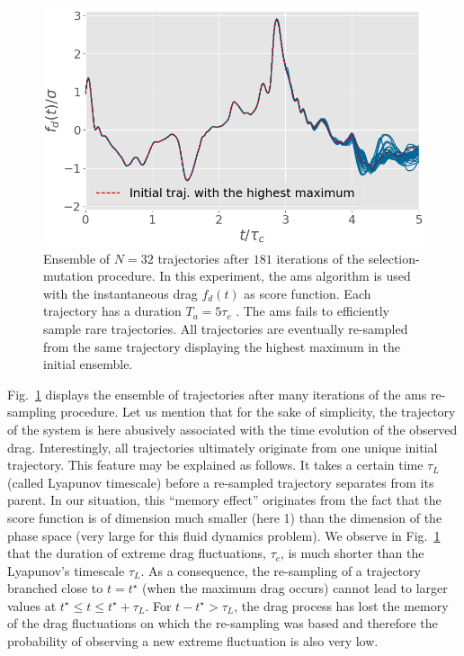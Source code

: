 \documentclass{jfm}
\newcommand{\EL}[1]{{\color{myred}{#1}}}
\begin{document}
\begin{figure}
  \centering
  \includegraphics[width=.7\linewidth]{AMS_drag_trajectories/AMS_drag_trajectories.png}
  \caption{\label{fig:AMS_drag_trajectories} Ensemble of $N = 32$ trajectories after $181$ iterations of the selection-mutation procedure. In this experiment, the \ac{ams} algorithm is used with the instantaneous drag $f_d(t)$ as score function. Each trajectory has a duration $T_a = 5\tau_c$ \EL{ where $\tau_c$ is the correlation time of the instantaneous drag}.
    The \ac{ams} fails to efficiently sample rare trajectories. All trajectories are eventually re-sampled from the same trajectory displaying the highest maximum in the initial ensemble.}
\end{figure}

% 
Fig.~\ref{fig:AMS_drag_trajectories} displays the ensemble of trajectories after many iterations of the \ac{ams} re-sampling procedure.
% 
Let us mention that for the sake of simplicity, the trajectory of the system is here abusively associated with the time evolution of the observed drag.
% 
Interestingly, all trajectories ultimately originate from one unique initial trajectory.
% 
This feature may be explained as follows.
It takes a certain time $\tau_L$ (called Lyapunov timescale) before a re-sampled trajectory separates from its parent. In our situation, this ``memory effect'' originates from the fact that the score function is of dimension much smaller (here 1) than the dimension of the phase space (very large for this fluid dynamics problem).
% 
We observe in Fig.~\ref{fig:AMS_drag_trajectories} that the duration of extreme drag fluctuations, $\tau_c$, is much shorter than the Lyapunov's timescale $\tau_L$.
As a consequence, the re-sampling of a trajectory branched close to $t=t^{\star}$ (when the maximum drag occurs) cannot lead to larger values at $t^{\star} \leq t \leq t^{\star}+\tau_L$.
For $t - t^{\star} >\tau_L$, the drag process has lost the memory of the drag fluctuations on which the re-sampling was based and therefore the probability of observing a new extreme fluctuation is also very low.
% 
\end{document}

